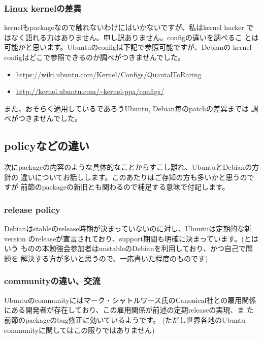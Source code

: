\documentclass[mingoth,a4paper]{jsarticle}
\begin{document}
\subsubsection{Linux kernelの差異}

kernelもpackageなので触れないわけにはいかないですが、私はkernel hacker
ではなく語れる力はありません。申し訳ありません。configの違いを調べるこ
とは可能かと思います。Ubuntuのconfigは下記で参照可能ですが、Debianの
kernel configはどこで参照できるのか調べがつきませんでした。

\begin{itemize}
\itemsep1pt\parskip0pt
\item
  \url{https://wiki.ubuntu.com/Kernel/Configs/QuantalToRaring}
\item
  \url{http://kernel.ubuntu.com/~kernel-ppa/configs/}
\end{itemize}

また、おそらく適用しているであろうUbuntu, Debian毎のpatchの差異までは
調べがつきませんでした。

\subsection{policyなどの違い}

次にpackageの内容のような具体的なことからすこし離れ、UbuntuとDebianの方針の
違いについてお話しします。このあたりはご存知の方も多いかと思うのですが
前節のpackageの新旧とも関わるので補足する意味で付記します。

\subsubsection{release policy}

Debianはstableのrelease時期が決まっていないのに対し、Ubuntuは定期的な新version
のreleaseが宣言されており、support期間も明確に決まっています。(とはいう
ものの本勉強会参加者はunstableのDebianを利用しており、かつ自己で問題を
解決する方が多いと思うので、一応書いた程度のものです)

\subsubsection{communityの違い、交流}

Ubuntuのcommunityにはマーク・シャトルワース氏のCanonical社との雇用関係
にある開発者が存在しており、この雇用関係が前述の定期releaseの実現、ま
た前節のpackageのbug修正に効いているようです。 (ただし世界各地のUbuntu
communityに関してはこの限りではありません)
\end{document}
